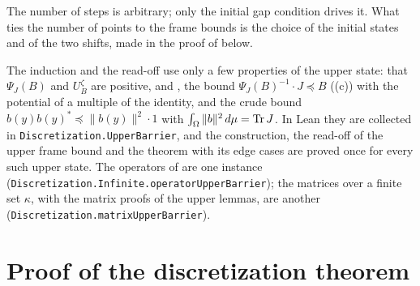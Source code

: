 The number of steps is arbitrary; only the initial gap condition drives it. What ties the
number of points to the frame bounds is the choice of the initial states and of the two
shifts, made in the proof of  below.

The induction and the read-off use only a few properties of the upper state: that
$\Psi_J(B)$ and $U_B^{\zeta}$ are positive,  and
, the bound $\Psi_J(B)^{-1} \cdot J \preceq B$
((c)) with the potential of a multiple of the identity, and the
crude bound $b(y) b(y)^* \preceq \|b(y)\|^2 \cdot 1$ with
$\int_\Omega \|b\|^2 \, d\mu = \operatorname{Tr} J$. In
Lean they are collected in \texttt{Discretization.UpperBarrier}, and the construction, the
read-off of the upper frame bound and the theorem with its edge cases are proved once for
every such upper state. The operators of  are one instance
(\texttt{Discretization.Infinite.operatorUpperBarrier}); the matrices over a finite set
$\kappa$, with the matrix proofs of the upper lemmas, are another
(\texttt{Discretization.matrixUpperBarrier}).

\section{Proof of the discretization theorem}

